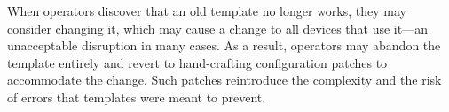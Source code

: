\documentclass[numbers, 10pt]{sigplanconf}
\newcommand{\IE}{\emph{i.e.}}
\begin{document}
When operators discover that an old template no longer works, they may consider changing it, which may cause a change to all devices that use it---an unacceptable disruption in many cases.  As a result, operators may abandon the template entirely and revert to hand-crafting configuration patches to accommodate the change.
Such patches reintroduce the complexity and the risk of errors that templates were meant to prevent.





\end{document}
